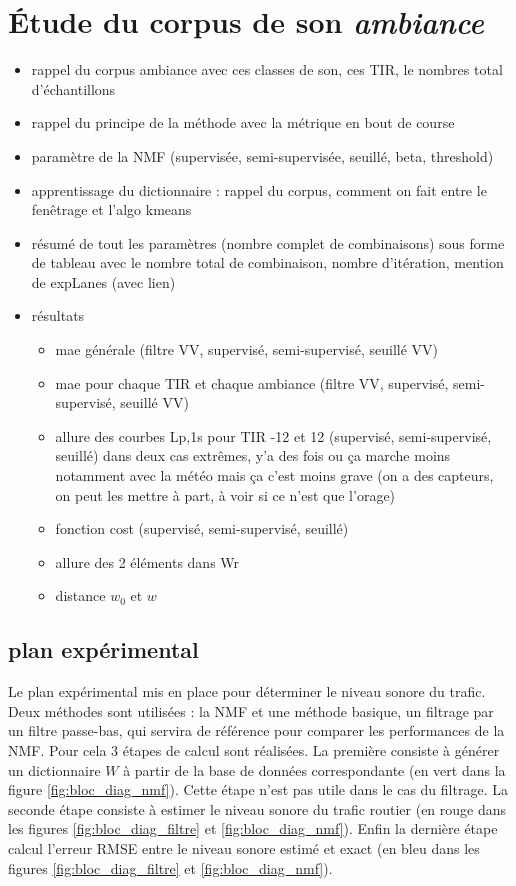 
\chapter{\'Etude du corpus de son \textit{ambiance}}
\label{chap:grafic}
\begin{itemize}
\item rappel du corpus ambiance avec ces classes de son, ces TIR, le nombres total d'échantillons
\item rappel du principe de la méthode avec la métrique en bout de course
\item paramètre de la NMF (supervisée, semi-supervisée, seuillé, beta, threshold)
\item apprentissage du dictionnaire : rappel du corpus, comment on fait entre le fenêtrage et l'algo kmeans
\item résumé de tout les paramètres (nombre complet de combinaisons) sous forme de tableau avec le nombre total de combinaison, nombre d'itération, mention de expLanes (avec lien)
\item résultats
\begin{itemize}
\item mae générale (filtre VV, supervisé, semi-supervisé, seuillé VV)
\item mae pour chaque TIR et chaque ambiance (filtre VV, supervisé, semi-supervisé, seuillé VV)
\item allure des courbes Lp,1s pour TIR -12 et 12 (supervisé, semi-supervisé, seuillé) dans deux cas extrêmes, y'a des fois ou ça marche moins notamment avec la météo mais ça c'est moins grave (on a des capteurs, on peut les mettre à part, à voir si ce n'est que l'orage)
\item fonction cost (supervisé, semi-supervisé, seuillé)
\item allure des 2 éléments dans Wr
\item distance $w_0$ et $w$
\end{itemize}

\end{itemize}

\section{plan expérimental}

Le plan expérimental mis en place pour déterminer le niveau sonore du trafic. Deux méthodes sont utilisées : la NMF et une méthode basique, un filtrage par un filtre passe-bas, qui servira de référence pour comparer les performances de la NMF. Pour cela 3 étapes de calcul sont réalisées. La première consiste à générer un dictionnaire $W$ à partir de la base de données correspondante (en vert dans la figure \ref{fig:bloc_diag_nmf}). Cette étape n'est pas utile dans le cas du filtrage. La seconde étape consiste à estimer le niveau sonore du trafic routier (en rouge dans les figures \ref{fig:bloc_diag_filtre} et \ref{fig:bloc_diag_nmf}). Enfin la dernière étape calcul l'erreur RMSE entre le niveau sonore estimé et exact (en bleu dans les figures \ref{fig:bloc_diag_filtre} et \ref{fig:bloc_diag_nmf}). \\

